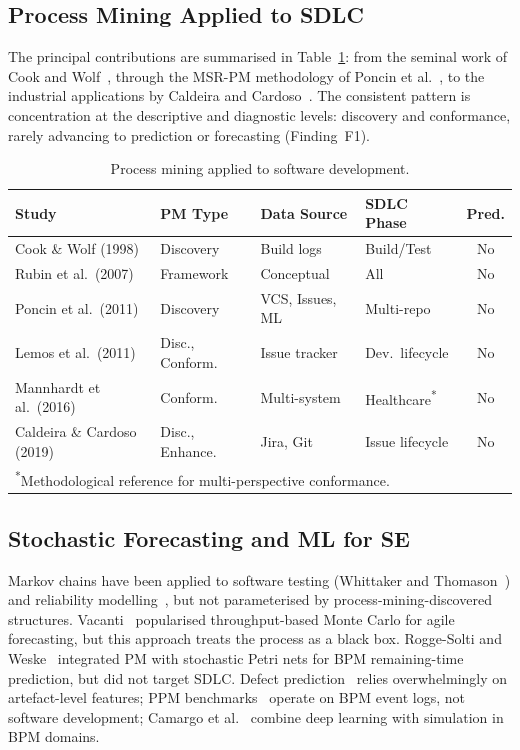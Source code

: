 \subsection{Process Mining Applied to SDLC}

The principal contributions are summarised in Table~\ref{tab:pm-sd}: from
the seminal work of Cook and Wolf~\cite{cook1998}, through the MSR-PM
methodology of Poncin et al.~\cite{poncin2011process}, to the industrial
applications by Caldeira and Cardoso~\cite{Caldeira2019AssessingSoftwareTeams}.
The consistent pattern is concentration at the descriptive and diagnostic
levels: discovery and conformance, rarely advancing to prediction or
forecasting (Finding~F1).

\begin{table}[htbp]
\centering
\caption{Process mining applied to software development.}
\label{tab:pm-sd}
\small
\begin{tabular}{p{4.0cm}p{2.5cm}p{2.2cm}p{2.0cm}c}
\toprule
\textbf{Study} & \textbf{PM Type} & \textbf{Data Source} &
\textbf{SDLC Phase} & \textbf{Pred.} \\
\midrule
Cook \& Wolf (1998)            & Discovery       & Build logs       & Build/Test     & No \\
Rubin et al.\ (2007)            & Framework       & Conceptual       & All            & No \\
Poncin et al.\ (2011)           & Discovery       & VCS, Issues, ML  & Multi-repo     & No \\
Lemos et al.\ (2011)            & Disc., Conform. & Issue tracker    & Dev.\ lifecycle & No \\
Mannhardt et al.\ (2016)        & Conform.        & Multi-system     & Healthcare\textsuperscript{*} & No \\
Caldeira \& Cardoso (2019)     & Disc., Enhance. & Jira, Git        & Issue lifecycle & No \\
\bottomrule
\multicolumn{5}{l}{\textsuperscript{*}\scriptsize{Methodological reference for multi-perspective conformance.}}
\end{tabular}
\end{table}

\subsection{Stochastic Forecasting and ML for SE}

Markov chains have been applied to software testing
(Whittaker and Thomason~\cite{whittaker1994}) and reliability
modelling~\cite{WhittakerRekabThomason2000}, but not parameterised by
process-mining-discovered structures.
Vacanti~\cite{vacanti2015} popularised throughput-based Monte Carlo for
agile forecasting, but this approach treats the process as a black box.
Rogge-Solti and Weske~\cite{RoggeSolti2015NonMarkovianSPN} integrated PM
with stochastic Petri nets for BPM remaining-time prediction, but did not
target SDLC. Defect prediction~\cite{Zimmermann2005MiningVersionHistories,
Wahono2015, pachouly2022} relies overwhelmingly on artefact-level
features; PPM benchmarks~\cite{tax2017, marquezChamorro2018} operate on
BPM event logs, not software development; Camargo et
al.~\cite{camargo2022learning} combine deep learning with simulation in
BPM domains.

